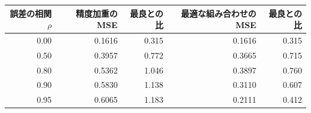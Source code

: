 \begin{tabular}{rrrrr}
\toprule
誤差の相関 $\rho$ & 精度加重の MSE & 最良との比 & 最適な組み合わせの MSE & 最良との比 \\
\midrule
0.00 & 0.1616 & 0.315 & 0.1616 & 0.315 \\
0.50 & 0.3957 & 0.772 & 0.3665 & 0.715 \\
0.80 & 0.5362 & 1.046 & 0.3897 & 0.760 \\
0.90 & 0.5830 & 1.138 & 0.3110 & 0.607 \\
0.95 & 0.6065 & 1.183 & 0.2111 & 0.412 \\
\bottomrule
\end{tabular}
